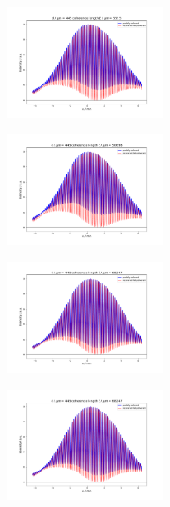 \documentclass{osa-article}
\begin{document}
\begin{figure}[htbp]

	\begin{subfigure}{.4\linewidth}
	    \includegraphics[width=0.5\textwidth]{gfx/13p5nm_S_445um/profile36.pdf}
	\end{subfigure}
	\begin{subfigure}{.4\linewidth}
	    \includegraphics[width=0.5\textwidth]{gfx/13p5nm_S_445um/profile50.pdf}
	\end{subfigure}
	\begin{subfigure}{.4\linewidth}
	    \includegraphics[width=0.5\textwidth]{gfx/13p5nm_S_445um/profile32.pdf}	
	\end{subfigure}
	\begin{subfigure}{.4\linewidth}
    	\includegraphics[width=0.5\textwidth]{gfx/13p5nm_S_445um/profile32.pdf}
	\end{subfigure}
\end{figure}
\end{document}
